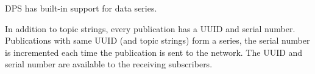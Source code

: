 D\+PS has built-\/in support for data series.

In addition to topic strings, every publication has a U\+U\+ID and serial number. Publications with same U\+U\+ID (and topic strings) form a series, the serial number is incremented each time the publication is sent to the network. The U\+U\+ID and serial number are available to the receiving subscribers. 